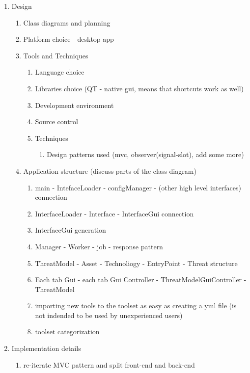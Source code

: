 \begin{enumerate}
	\item Design
	\begin{enumerate}
		\item Class diagrams and planning
			\item Platform choice - desktop app
			\item Tools and Techniques
			\begin{enumerate}
				\item Language choice
				\item Libraries choice (QT - native gui, means that shortcuts work as well)
				\item Development environment
				\item Source control
				\item Techniques
				\begin{enumerate}
					\item Design patterns used (mvc, observer(signal-slot), add some more)
				\end{enumerate}
			\end{enumerate}
		\item Application structure (discuss parts of the class diagram)
		\begin{enumerate}
			\item main - IntefaceLoader - configManager - (other high level interfaces) connection
			\item InterfaceLoader - Interface - InterfaceGui connection
			\item InterfaceGui generation
			\item Manager - Worker - job - response pattern
			\item ThreatModel - Asset - Technoliogy - EntryPoint - Threat structure
			\item Each tab Gui - each tab Gui Controller - ThreatModelGuiController - ThreatModel
			
		\item importing new tools to the toolset as easy as creating a yml file (is not indended to be used by unexperienced users)
		\item toolset categorization
	\end{enumerate}
			
	\end{enumerate}

	\item Implementation details
	\begin{enumerate}
		\item re-iterate MVC pattern and split front-end and back-end 
		

\end{enumerate}
\end{enumerate}
